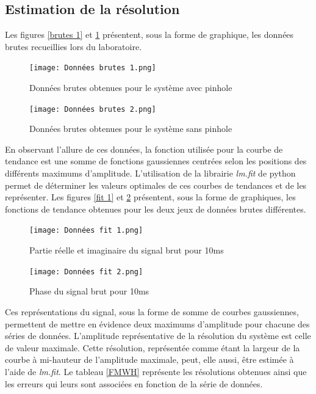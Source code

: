 \documentclass[11pt,letterpaper]{article}
\begin{document}
\subsection{Estimation de la résolution}

Les figures \ref{brutes 1} et \ref{brutes 2} présentent, sous la forme de graphique, les données brutes recueillies lors du laboratoire. 

\begin{figure}[h!]
    \centering
    \begin{minipage}[t]{0.46\linewidth}
        \centering
        \texttt{[image: Données brutes 1.png]}
        \caption{Données brutes obtenues pour le système avec pinhole}
        \label{brutes 1}
    \end{minipage}\hfill
    \begin{minipage}[t]{0.5\linewidth}
        \centering
        \texttt{[image: Données brutes 2.png]}
        \caption{Données brutes obtenues pour le système sans pinhole}
        \label{brutes 2}
    \end{minipage}

\end{figure}

En observant l'allure de ces données, la fonction utilisée pour la courbe de tendance est une somme de fonctions gaussiennes centrées selon les positions des différents maximums d'amplitude. L'utilisation de la librairie \textit{lm.fit} de python permet de déterminer les valeurs optimales de ces courbes de tendances et de les représenter. Les figures \ref{fit 1} et \ref{fit 2} présentent, sous la forme de graphiques, les fonctions de tendance obtenues pour les deux jeux de données brutes différentes. 

\begin{figure}[h!]
    \centering
    \begin{minipage}[t]{0.46\linewidth}
        \centering
        \texttt{[image: Données fit 1.png]}
        \caption{Partie réelle et imaginaire du signal brut pour 10ms}
        \label{fit 1}
    \end{minipage}\hfill
    \begin{minipage}[t]{0.5\linewidth}
        \centering
        \texttt{[image: Données fit 2.png]}
        \caption{Phase du signal brut pour 10ms}
        \label{fit 2}
    \end{minipage}
\end{figure}

Ces représentations du signal, sous la forme de somme de courbes gaussiennes, permettent de mettre en évidence deux maximums d'amplitude pour chacune des séries de données. L'amplitude représentative de la résolution du système est celle de valeur maximale. Cette résolution, représentée comme étant la largeur de la courbe à mi-hauteur de l'amplitude maximale, peut, elle aussi, être estimée à l'aide de \textit{lm.fit}. Le tableau \ref{FMWH} représente les résolutions obtenues ainsi que les erreurs qui leurs sont associées en fonction de la série de données.
\end{document}
